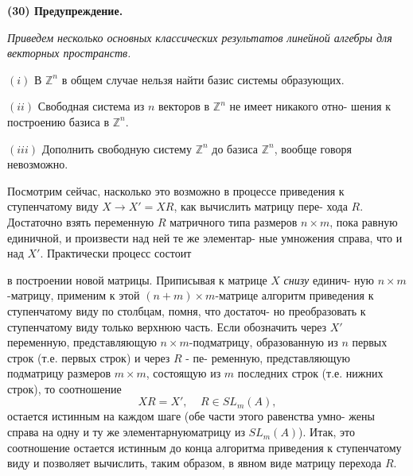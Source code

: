 \documentclass{mai_book}
\begin{document}
	\noindent
	{\bf (30) Предупреждение.}
	
	{\it Приведем несколько основных классических результатов линейной\linebreak
	алгебры для векторных пространств.
	
	$(i)$ В ${\mathbb Z}^n$ в общем случае нельзя найти базис системы образующих.
	
	$(ii)$ Свободная система из $n$ векторов в ${\mathbb Z}^n$ не имеет никакого отно-\linebreak
	шения к построению базиса в ${\mathbb Z}^n$.
	
	$(iii)$ Дополнить свободную систему ${\mathbb Z}^n$ до базиса ${\mathbb Z}^n$, вообще говоря\linebreak
	невозможно.}

	Посмотрим сейчас, насколько это возможно в процессе приведения\linebreak
	к ступенчатому виду $X \rightarrow X' = XR$, как вычислить матрицу пере-\linebreak
	хода $R$. Достаточно взять переменную $R$ матричного типа размеров\linebreak
	$n\times m$, пока равную единичной, и произвести над ней те же элементар-\linebreak
	ные умножения справа, что и над $X'$. Практически процесс состоит\linebreak
	
	\pagebreak
	
	
	\noindent
	в построении новой матрицы. Приписывая к матрице $X$ {\it снизу} единич-\linebreak
	ную $n\times m$-матрицу, применим к этой $(n + m) \times m$-матрице алгоритм\linebreak
	приведения к ступенчатому виду по столбцам, помня, что достаточ-\linebreak
	но преобразовать к ступенчатому виду только верхнюю часть. Если\linebreak
	обозначить через $X'$ переменную, представляющую $n\times m$-подматрицу,\linebreak
	образованную из $n$ первых строк (т.е. первых строк) и через $R$ - пе-\linebreak
	ременную, представляющую подматрицу размеров $m\times m$, состоящую\linebreak
	из $m$ последних строк (т.е. нижних строк), то соотношение\linebreak
	$$XR = X', \ \ \ \ \ R \in SL_{m}(A),$$
	остается истинным на каждом шаге (обе части этого равенства умно-\linebreak
	жены справа на одну и ту же элементарнуюматрицу из $SL_{m}(A)$). Итак,\linebreak
	это соотношение остается истинным до конца алгоритма приведения к\linebreak
	ступенчатому виду и позволяет вычислить, таким образом, в явном\linebreak
	виде матрицу перехода $R$.
	
\end{document}
